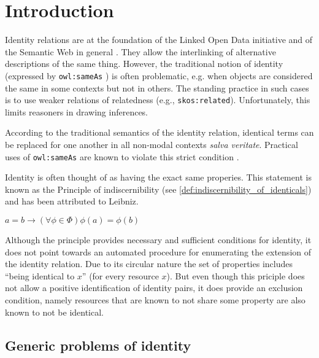 \section{Introduction}
\label{sec:introduction}

Identity relations are at the foundation of the Linked Open Data initiative
  and of the Semantic Web in general \cite{bizer_cyganiak_heath_2007}.
They allow the interlinking of alternative descriptions of the same thing.
However, the traditional notion of identity
  (expressed by \verb|owl:sameAs| \cite{motic_paterschneider_grau_2012})
  is often problematic, e.g. when objects are considered the same in some
  contexts but not in others.
The standing practice in such cases is to use weaker relations of relatedness
  (e.g., \verb|skos:related|).
Unfortunately, this limits reasoners in drawing inferences.

According to the traditional semantics of the identity relation,
  identical terms can be replaced for one another in all non-modal contexts
  \emph{salva veritate}.
Practical uses of \verb|owl:sameAs| are known to violate this strict condition
  \cite{halpin_hayes_2010,halpin_hayes_mccusker_mcguinness_thompson_2010}.

Identity is often thought of as having the exact same properies.
This statement is known as the Principle of indiscernibility
(see \ref{def:indiscernibility_of_identicals})
and has been attributed to Leibniz.\cite{TODO}

\begin{definition}
\label{def:indiscernibility_of_identicals}
$a = b \rightarrow (\forall \phi \in \Phi) \phi(a) = \phi(b)$
\end{definition}

Although the principle provides necessary and sufficient conditions
  for identity, it does not point towards an automated procedure
  for enumerating the extension of the identity relation.
Due to its circular nature the set of properties includes
  ``being identical to $x$'' (for every resource $x$).
But even though this priciple does not
  allow a positive identification of identity pairs,
  it does provide an exclusion condition,
  namely resources that are known to not share some property
  are also known to not be identical.

\subsection{Generic problems of identity}

